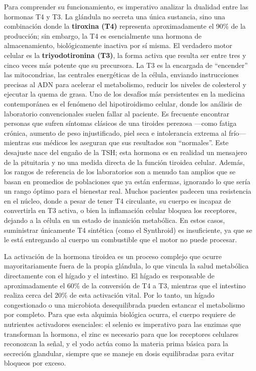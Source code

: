 \documentclass[
  spanish,
]{article}
\begin{document}
Para comprender su funcionamiento, es imperativo analizar la dualidad entre las hormonas T4 y T3. La glándula no secreta una única sustancia, sino una combinación donde la \textbf{tiroxina (T4)} representa aproximadamente el 90\% de la producción; sin embargo, la T4 es esencialmente una hormona de almacenamiento, biológicamente inactiva por sí misma. El verdadero motor celular es la \textbf{triyodotironina (T3)}, la forma activa que resulta ser entre tres y cinco veces más potente que su precursora. La T3 es la encargada de ``encender'' las mitocondrias, las centrales energéticas de la célula, enviando instrucciones precisas al ADN para acelerar el metabolismo, reducir los niveles de colesterol y ejecutar la quema de grasa.
Uno de los desafíos más persistentes en la medicina contemporánea es el fenómeno del hipotiroidismo celular, donde los análisis de laboratorio convencionales suelen fallar al paciente. Es frecuente encontrar personas que sufren síntomas clásicos de una tiroides perezosa ---como fatiga crónica, aumento de peso injustificado, piel seca e intolerancia extrema al frío--- mientras sus médicos les aseguran que sus resultados son ``normales''. Este desajuste nace del engaño de la TSH; esta hormona es en realidad un mensajero de la pituitaria y no una medida directa de la función tiroidea celular. Además, los rangos de referencia de los laboratorios son a menudo tan amplios que se basan en promedios de poblaciones que ya están enfermas, ignorando lo que sería un rango óptimo para el bienestar real. Muchos pacientes padecen una resistencia en el núcleo, donde a pesar de tener T4 circulante, su cuerpo es incapaz de convertirla en T3 activa, o bien la inflamación celular bloquea los receptores, dejando a la célula en un estado de inanición metabólica. En estos casos, suministrar únicamente T4 sintética (como el Synthroid) es insuficiente, ya que se le está entregando al cuerpo un combustible que el motor no puede procesar.

La activación de la hormona tiroidea es un proceso complejo que ocurre mayoritariamente fuera de la propia glándula, lo que vincula la salud metabólica directamente con el hígado y el intestino. El hígado es responsable de aproximadamente el 60\% de la conversión de T4 a T3, mientras que el intestino realiza cerca del 20\% de esta activación vital. Por lo tanto, un hígado congestionado o una microbiota desequilibrada pueden estancar el metabolismo por completo. Para que esta alquimia biológica ocurra, el cuerpo requiere de nutrientes activadores esenciales: el selenio es imperativo para las enzimas que transforman la hormona, el zinc es necesario para que los receptores celulares reconozcan la señal, y el yodo actúa como la materia prima básica para la secreción glandular, siempre que se maneje en dosis equilibradas para evitar bloqueos por exceso.
\end{document}
